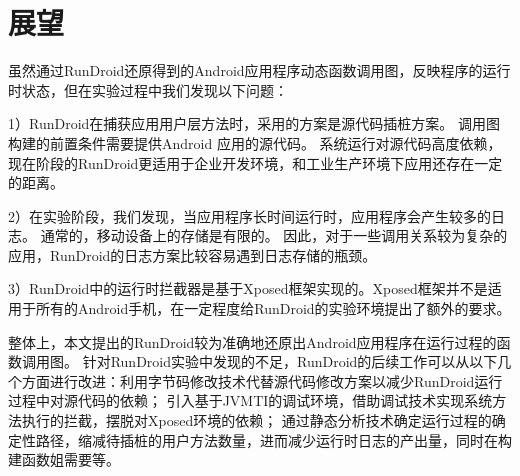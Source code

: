
\section{展望}

虽然通过RunDroid还原得到的Android应用程序动态函数调用图，反映程序的运行时状态，但在实验过程中我们发现以下问题：

1）RunDroid在捕获应用用户层方法时，采用的方案是源代码插桩方案。
调用图构建的前置条件需要提供Android 应用的源代码。
系统运行对源代码高度依赖，现在阶段的RunDroid更适用于企业开发环境，和工业生产环境下应用还存在一定的距离。

2）在实验阶段，我们发现，当应用程序长时间运行时，应用程序会产生较多的日志。
通常的，移动设备上的存储是有限的。
因此，对于一些调用关系较为复杂的应用，RunDroid的日志方案比较容易遇到日志存储的瓶颈。

3）RunDroid中的运行时拦截器是基于Xposed框架实现的。Xposed框架并不是适用于所有的Android手机，在一定程度给RunDroid的实验环境提出了额外的要求。

整体上，本文提出的RunDroid较为准确地还原出Android应用程序在运行过程的函数调用图。
针对RunDroid实验中发现的不足，RunDroid的后续工作可以从以下几个方面进行改进：利用字节码修改技术代替源代码修改方案以减少RunDroid运行过程中对源代码的依赖；
引入基于JVMTI的调试环境，借助调试技术实现系统方法执行的拦截，摆脱对Xposed环境的依赖；
通过静态分析技术确定运行过程的确定性路径，缩减待插桩的用户方法数量，进而减少运行时日志的产出量，同时在构建函数姐需要等。